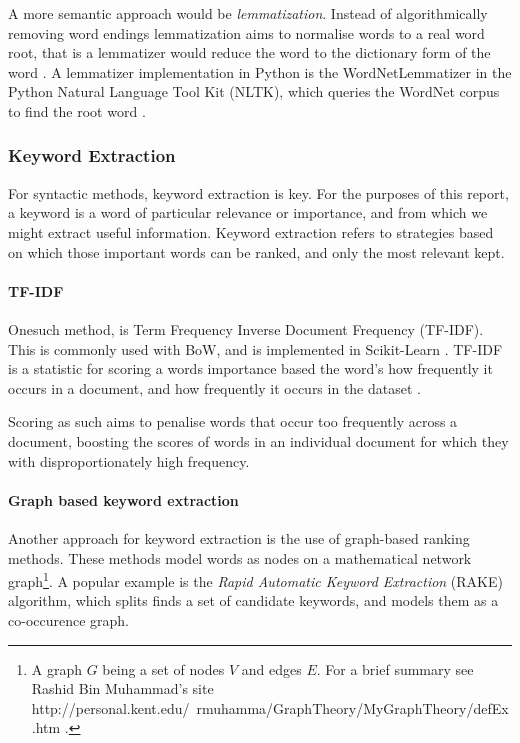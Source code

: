A more semantic approach would be \emph{lemmatization}. Instead of algorithmically removing word endings lemmatization 
aims to normalise words to a real word root, that is a lemmatizer would reduce the word to the dictionary
form of the word \cite{Jayakodi2016}.  A lemmatizer implementation in Python is the WordNetLemmatizer in the Python 
Natural Language Tool Kit (NLTK), which queries the WordNet corpus to find the root word 
\cite{StevenBirdEwanKlein2009, princetonuniversity_2010}. 
 
\subsubsection{Keyword Extraction}\label{sssec:kwe}
For syntactic methods, keyword extraction is key.  For the purposes of this report, a keyword is a word of particular
relevance or importance, and from which we might extract useful information.  Keyword extraction refers to strategies
based on which those important words can be ranked, and only the most relevant kept.

\paragraph{TF-IDF}\label{ssec:tfidf}

Onesuch method, is Term Frequency Inverse Document Frequency (TF-IDF). This is commonly used with BoW, and is 
implemented in Scikit-Learn \cite{Barupal2011}.  TF-IDF is a statistic for scoring a words importance based the word's
how frequently it occurs in a document, and how frequently it occurs in the dataset \cite{Ramos2003}.

Scoring as such aims to penalise words that occur too frequently across a document, boosting the scores of words in an 
individual document for which they with disproportionately high frequency.

\paragraph{Graph based keyword extraction}\label{sssec:gbkwe}

Another approach for keyword extraction is the use of graph-based ranking methods.  These methods model words as
nodes on a mathematical network graph\footnote{A graph $G$ being a set of nodes $V$ and edges $E$.  For a brief 
summary see Rashid Bin Muhammad's site http://personal.kent.edu/~rmuhamma/GraphTheory/MyGraphTheory/defEx.htm
\cite{muhammad}.}.  A popular example is the \emph{Rapid Automatic Keyword Extraction} (RAKE) algorithm, which
splits finds a set of candidate keywords, and models them as a co-occurence graph.  

